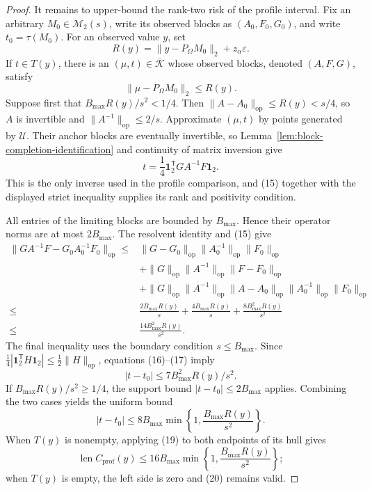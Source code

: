 \documentclass{article}
\begin{document}
\begin{proof}
It remains to upper-bound the rank-two risk of the profile interval.  Fix an arbitrary \(M_0\in\mathcal M_2(s)\), write its observed blocks as \((A_0,F_0,G_0)\), and write \(t_0=\tau(M_0)\).  For an observed value \(y\), set
\[
 R(y)=\lVert y-P_\Omega M_0\rVert_2+z_\alpha\varepsilon.
\tag{14}
\]
If \(t\in T(y)\), there is an \((\mu,t)\in\overline{\mathcal K}\) whose observed blocks, denoted \((A,F,G)\), satisfy
\[
 \lVert\mu-P_\Omega M_0\rVert_2\leq R(y).
\tag{15}
\]
Suppose first that \(B_{\max}R(y)/s^2<1/4\).  Then \(\lVert A-A_0\rVert_{\mathrm{op}}\leq R(y)<s/4\), so \(A\) is invertible and \(\lVert A^{-1}\rVert_{\mathrm{op}}\leq2/s\).  Approximate \((\mu,t)\) by points generated by \(\mathcal U\).  Their anchor blocks are eventually invertible, so Lemma~\ref{lem:block-completion-identification} and continuity of matrix inversion give
\[
 t=\frac14\mathbf1_2^{\mathsf T}GA^{-1}F\mathbf1_2.
\tag{16}
\]
This is the only inverse used in the profile comparison, and (15) together with the displayed strict inequality supplies its rank and positivity condition.

All entries of the limiting blocks are bounded by \(B_{\max}\).  Hence their operator norms are at most \(2B_{\max}\).  The resolvent identity and (15) give
\[
\begin{split}
 \lVert GA^{-1}F-G_0A_0^{-1}F_0\rVert_{\mathrm{op}}
 \leq{}&\lVert G-G_0\rVert_{\mathrm{op}}\lVert A_0^{-1}\rVert_{\mathrm{op}}\lVert F_0\rVert_{\mathrm{op}}\\
 &+\lVert G\rVert_{\mathrm{op}}\lVert A^{-1}\rVert_{\mathrm{op}}\lVert F-F_0\rVert_{\mathrm{op}}\\
 &+\lVert G\rVert_{\mathrm{op}}\lVert A^{-1}\rVert_{\mathrm{op}}
 \lVert A-A_0\rVert_{\mathrm{op}}\lVert A_0^{-1}\rVert_{\mathrm{op}}
 \lVert F_0\rVert_{\mathrm{op}}\\
 \leq{}&\frac{2B_{\max}R(y)}s+\frac{4B_{\max}R(y)}s
 +\frac{8B_{\max}^2R(y)}{s^2}\\
 \leq{}&\frac{14B_{\max}^2R(y)}{s^2}.
\end{split}
\tag{17}
\]
The final inequality uses the boundary condition \(s\leq B_{\max}\).  Since \(\tfrac14|\mathbf1_2^{\mathsf T}H\mathbf1_2|\leq\tfrac12\lVert H\rVert_{\mathrm{op}}\), equations (16)--(17) imply
\[
 |t-t_0|\leq7B_{\max}^2R(y)/s^2.
\tag{18}
\]
If \(B_{\max}R(y)/s^2\geq1/4\), the support bound \(|t-t_0|\leq2B_{\max}\) applies.  Combining the two cases yields the uniform bound
\[
 |t-t_0|\leq8B_{\max}
 \min\left\{1,\frac{B_{\max}R(y)}{s^2}\right\}.
\tag{19}
\]
When \(T(y)\) is nonempty, applying (19) to both endpoints of its hull gives
\[
 \operatorname{len}C_{\mathrm{prof}}(y)
 \leq16B_{\max}
 \min\left\{1,\frac{B_{\max}R(y)}{s^2}\right\};
\tag{20}
\]
when \(T(y)\) is empty, the left side is zero and (20) remains valid.


\end{proof}
\end{document}

